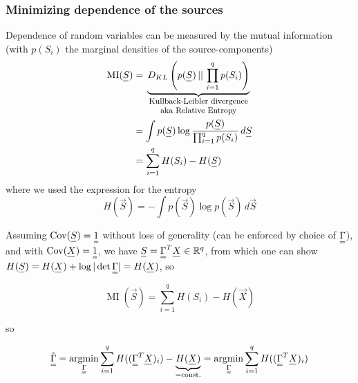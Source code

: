 \subsubsection{Minimizing dependence of the sources}
Dependence of random variables can be measured by the mutual information (with $p(S_i)$ the marginal
densities of the source-components)
\begin{equation}
    \begin{aligned}
        \operatorname{MI}(\vec{S}) &= \explain{D_{KL}\left( p(\vec{S}) \, || \, \prod_{i=1}^q p(S_i) \right)}{Kullback-Leibler divergence aka Relative Entropy} \\
        &= \int p(\vec{S}) \log \frac{p(\vec{S})}{\prod_{i=1}^q p(S_i)} \, d\vec{S} \\
        &= \sum_{i=1}^{q} H(S_i) - H(\vec{S})
    \end{aligned}
\end{equation}
where we used the expression for the entropy
\begin{equation}
    H(\vec{S}) = - \int p(\vec{S}) \log p(\vec{S}) \, d\vec{S}
\end{equation}

Assuming $\Cov(\vec{S}) = \mat{1}$ without loss of generality (can be enforced by choice of $\mat{\Gamma}$), and
with $\Cov(\vec{X}) = \mat{1}$, we have $\vec{S} = \mat{\Gamma}^T \vec{X} \in \mathbb{R}^{q}$, from which
one can show $H(\vec{S}) = H(\vec{X}) + \log |\det \mat{\Gamma}| = H(\vec{X})$, so

\begin{equation}
    \operatorname{MI}(\vec{S}) = \sum_{i=1}^{q} H(S_i) - H(\vec{X})
\end{equation}

so

\begin{equation}
    \mat{\hat{\Gamma}} = \argmin_{\mat{\Gamma}} \sum_{i=1}^{q} H((\mat{\Gamma}^T \vec{X})_i) - \underbrace{H(\vec{X})}_{=\text{const.}} = \argmin_{\mat{\Gamma}} \sum_{i=1}^{q} H((\mat{\Gamma}^T \vec{X})_i)
\end{equation}



